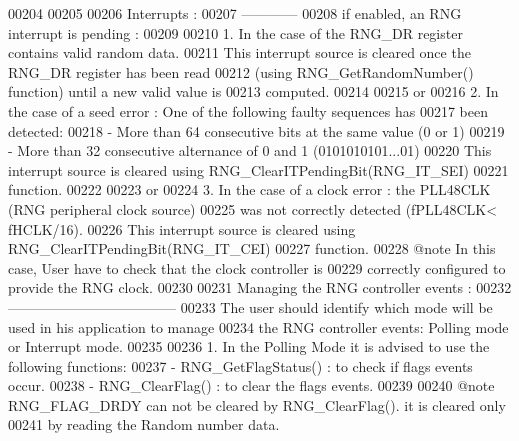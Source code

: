\begin{DoxyCode}
00204 \textcolor{comment}{              }
00205 \textcolor{comment}{}
00206 \textcolor{comment}{  Interrupts :}
00207 \textcolor{comment}{  ------------}
00208 \textcolor{comment}{   if enabled, an RNG interrupt is pending :}
00209 \textcolor{comment}{    }
00210 \textcolor{comment}{   1.  In the case of the RNG\_DR register contains valid random data. }
00211 \textcolor{comment}{       This interrupt source is cleared once the RNG\_DR register has been read }
00212 \textcolor{comment}{       (using RNG\_GetRandomNumber() function) until a new valid value is }
00213 \textcolor{comment}{       computed. }
00214 \textcolor{comment}{   }
00215 \textcolor{comment}{   or }
00216 \textcolor{comment}{   2. In the case of a seed error : One of the following faulty sequences has }
00217 \textcolor{comment}{      been detected:}
00218 \textcolor{comment}{      - More than 64 consecutive bits at the same value (0 or 1)}
00219 \textcolor{comment}{      - More than 32 consecutive alternance of 0 and 1 (0101010101...01)}
00220 \textcolor{comment}{      This interrupt source is cleared using RNG\_ClearITPendingBit(RNG\_IT\_SEI)}
00221 \textcolor{comment}{      function.}
00222 \textcolor{comment}{   }
00223 \textcolor{comment}{   or}
00224 \textcolor{comment}{   3. In the case of a clock error : the PLL48CLK (RNG peripheral clock source) }
00225 \textcolor{comment}{      was not correctly detected (fPLL48CLK< fHCLK/16).}
00226 \textcolor{comment}{      This interrupt source is cleared using RNG\_ClearITPendingBit(RNG\_IT\_CEI)}
00227 \textcolor{comment}{      function.}
00228 \textcolor{comment}{      @note In this case, User have to check that the clock controller is }
00229 \textcolor{comment}{            correctly configured to provide the RNG clock. }
00230 \textcolor{comment}{}
00231 \textcolor{comment}{  Managing the RNG controller events :}
00232 \textcolor{comment}{  ------------------------------------ }
00233 \textcolor{comment}{  The user should identify which mode will be used in his application to manage }
00234 \textcolor{comment}{  the RNG controller events: Polling mode or Interrupt mode.}
00235 \textcolor{comment}{  }
00236 \textcolor{comment}{  1.  In the Polling Mode it is advised to use the following functions:}
00237 \textcolor{comment}{      - RNG\_GetFlagStatus() : to check if flags events occur. }
00238 \textcolor{comment}{      - RNG\_ClearFlag()     : to clear the flags events.}
00239 \textcolor{comment}{  }
00240 \textcolor{comment}{  @note RNG\_FLAG\_DRDY can not be cleared by RNG\_ClearFlag(). it is cleared only }
00241 \textcolor{comment}{        by reading the Random number data.      }

\end{DoxyCode}
